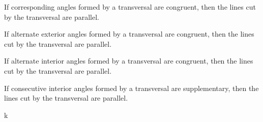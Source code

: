 \begin{tcolorbox}[colback=RoyalPurple!5!white,colframe=RoyalPurple!75!black,title=Corresponding Angles Converse Postulate]
  If corresponding angles formed by a transversal are congruent, then the lines cut by the transversal are parallel.
\end{tcolorbox}

\threestars

\begin{tcolorbox}[colback=Red!5!white,colframe=Red!75!black,title=Alternate Exterior Angles Converse Theorem]
  If alternate exterior angles formed by a transversal are congruent, then the lines cut by the transversal are parallel.
\end{tcolorbox}

\vspace{.2cm}

\begin{tcolorbox}[colback=Red!5!white,colframe=Red!75!black,title=Alternate Interior Angles Converse Theorem]
  If alternate interior angles formed by a transversal are congruent, then the lines cut by the transversal are parallel.
\end{tcolorbox}

\vspace{.2cm}

\begin{tcolorbox}[colback=Red!5!white,colframe=Red!75!black,title=Consecutive Interior Angles Converse Theorem]
  If consecutive interior angles formed by a transversal are supplementary, then the lines cut by the transversal are parallel.
\end{tcolorbox}

\newpage

k
